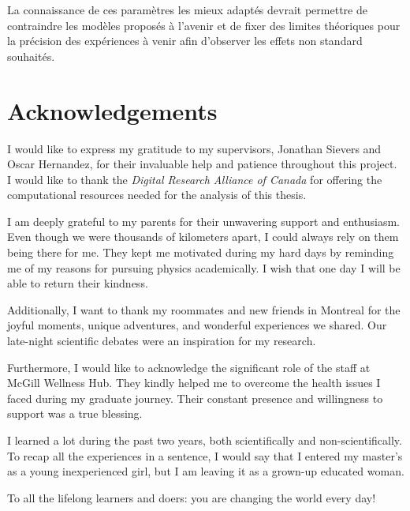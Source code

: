 \documentclass[12pt, TexShade, letterpaper]{report}
\begin{document}
La connaissance de ces paramètres les mieux adaptés devrait permettre de contraindre les modèles proposés à l'avenir et de fixer des limites théoriques pour la précision des expériences à venir afin d'observer les effets non standard souhaités.\par
\chapter*{Acknowledgements}
	\label{chap:acknowledgments}
I would like to express my gratitude to my supervisors, Jonathan Sievers and Oscar Hernandez, for their invaluable help and patience throughout this project. I would like to thank the \emph{Digital Research Alliance of Canada} for offering the computational resources needed for the analysis of this thesis.\par
I am deeply grateful to my parents for their unwavering support and enthusiasm. Even though we were thousands of kilometers apart, I could always rely on them being there for me. They kept me motivated during my hard days by reminding me of my reasons for pursuing physics academically. I wish that one day I will be able to return their kindness.\par
Additionally, I want to thank my roommates and new friends in Montreal for the joyful moments, unique adventures, and wonderful experiences we shared. Our late-night scientific debates were an inspiration for my research. \par
Furthermore, I would like to acknowledge the significant role of the staff at McGill Wellness Hub. They kindly helped me to overcome the health issues I faced during my graduate journey. Their constant presence and willingness to support was a true blessing.\par
I learned a lot during the past two years, both scientifically and non-scientifically. To recap all the experiences in a sentence, I would say that I entered my master's as a young inexperienced girl, but I am leaving it as a grown-up educated woman.\par

 To all the lifelong learners and doers: you are changing the world every day!
	\tableofcontents\thispagestyle{plain}
\end{document}
